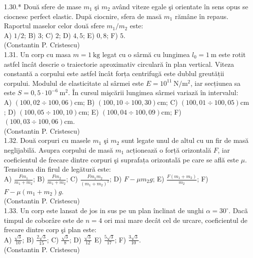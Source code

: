 \documentclass[10pt]{article}
\begin{document}
1.30.* Două sfere de mase $m_{1}$ şi $m_{2}$ având viteze egale şi orientate în sens opus se ciocnesc perfect elastic. După ciocnire, sfera de masă $m_{1}$ rămâne în repaus. Raportul maselor celor două sfere $m_{1} / m_{2}$ este:\\ A) $1 / 2$; B) $3$; C) $2$; D) $4,5$; E) $0,8$; F) $5$.\\ (Constantin P. Cristescu)\\

1.31. Un corp cu masa $m=1 \mathrm{~kg}$ legat cu o sârmă cu lungimea $l_{0}=1 \mathrm{~m}$ este rotit astfel încât descrie o traiectorie aproximativ circulară în plan vertical. Viteza constantă a corpului este astfel încât forța centrifugă este dublul greutății corpului. Modulul de elasticitate al sârmei este $E=10^{11} \mathrm{~N} / \mathrm{m}^{2}$, iar secțiunea sa este $S=0,5 \cdot 10^{-6} \mathrm{~m}^{2}$. În cursul mişcării lungimea sârmei variază în intervalul:\\ A) $(100,02 \div 100,06) \mathrm{cm}$; B) $(100,10 \div 100,30) \mathrm{cm}$; C) $(100,01 \div 100,05) \mathrm{cm}$; D) $(100,05 \div 100,10) \mathrm{cm}$; E) $(100,04 \div 100,09) \mathrm{cm}$; F) $(100,03 \div 100,06) \mathrm{cm}$.\\ (Constantin P. Cristescu)\\

1.32. Două corpuri cu masele $m_{1}$ şi $m_{2}$ sunt legate unul de altul cu un fir de masă neglijabilă. Asupra corpului de masă $m_{1}$ acționează o forță orizontală $F$, iar coeficientul de frecare dintre corpuri şi suprafața orizontală pe care se află este $\mu$. Tensiunea din firul de legătură este:\\ A) $\frac{F m_{1}}{m_{1}+m_{2}}$; B) $\frac{F m_{2}}{m_{1}+m_{2}}$; C) $\frac{F m_{1} m_{2}}{\left(m_{1}+m_{2}\right)^{2}}$; D) $F-\mu m_{2} g$; E) $\frac{F\left(m_{1}+m_{2}\right)}{m_{2}}$; F) $F-\mu\left(m_{1}+m_{2}\right) g$.\\ (Constantin P. Cristescu)\\

1.33. Un corp este lansat de jos in sus pe un plan înclinat de unghi $\alpha=30^{\circ}$. Dacã timpul de coborâre este de $n=4$ ori mai mare decât cel de urcare, coeficientul de frecare dintre corp şi plan este:\\ A) $\frac{\sqrt{3}}{10}$; B) $\frac{2 \sqrt{3}}{15}$; C) $\frac{\sqrt{3}}{8}$; D) $\frac{\sqrt{3}}{12}$ E) $\frac{5 \sqrt{3}}{17}$; F) $\frac{3 \sqrt{3}}{10}$.\\ (Constantin P. Cristescu)\\
\end{document}
